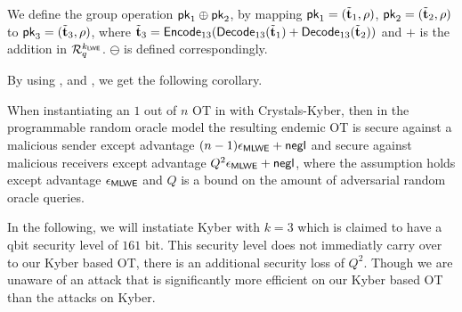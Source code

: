 We define the group operation $\mathsf{pk}_1\oplus\mathsf{pk}_2$, by mapping $\mathsf{pk}_1=(\tilde{{\mathbf t}}_1,\rho)$, $\mathsf{pk}_2=(\tilde{{\mathbf t}}_2,\rho)$ to $\mathsf{pk}_3=(\tilde{{\mathbf t}}_3, \rho)$, where $\tilde{{\mathbf t}}_3=\mathsf{Encode}_{13}(\mathsf{Decode}_{13}(\tilde{{\mathbf t}}_1)+\mathsf{Decode}_{13}(\tilde{{\mathbf t}}_2))$ and $+$ is the addition in $\mathcal R_q^{k_{\mathsf{LWE}}}$. $\ominus$ is defined correspondingly. 

By using ,  and , we get the following corollary.
 
\begin{corollary}
When instantiating an $1$ out of $n$ OT in  with Crystals-Kyber, then in the programmable random oracle model the resulting endemic OT is secure against a malicious sender except advantage $(n-1)\epsilon_{\mathsf{MLWE}}+\mathsf{negl}$  and secure against malicious receivers except advantage $Q^2\epsilon_{\mathsf{MLWE}}+\mathsf{negl}$, where the \MLWE assumption holds except advantage $\epsilon_{\mathsf{MLWE}}$ and $Q$ is a bound on the amount of adversarial random oracle queries.
\end{corollary}

In the following, we will instatiate Kyber with $k=3$ which is claimed to have a qbit security level of $161$ bit. This security level does not immediatly carry over to our Kyber based OT, there is an additional security loss of $Q^2$. Though we are unaware of an attack that is significantly more efficient on our Kyber based OT than the attacks on Kyber.